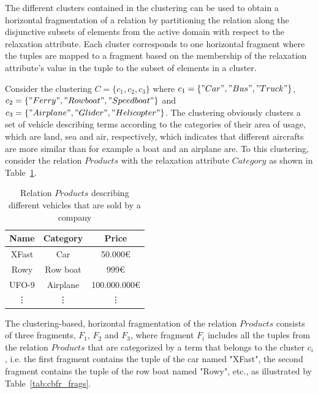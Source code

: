 The different clusters contained in the clustering can be used to obtain a horizontal fragmentation of a relation by partitioning the relation along the 
disjunctive subsets of elements from the active domain with respect to the relaxation attribute. Each cluster corresponds to one horizontal fragment where
the tuples are mapped to a fragment based on the membership of the relaxation attribute's value in the tuple to the subset of elements in a cluster. 

\begin{exmp}
\label{sec:meth_cbfr_exmp}
Consider the clustering $C=\{c_1, c_2, c_3\}$ where $c_1=\{"Car","Bus","Truck"\}$, $c_2=\{"Ferry","Row boat","Speedboat"\}$ and $c_3=\{"Airplane", 
"Glider","Helicopter"\}$. The clustering obviously clusters a set of vehicle describing terms according to the categories of their area of usage, which 
are land, sea and air, respectively, which indicates that different aircrafts are more similar than for example a boat and an airplane are. To this
clustering, consider the relation $Products$ with the relaxation attribute $Category$ as shown in Table~\ref{tab:cbfr_products}.

\begin{table}[h]
    \centering
    \begin{tabular}{|c|c|c|}
        \hline
        Name & Category & Price \\
        \hline
        XFast & Car & 50.000€ \\
        Rowy & Row boat & 999€ \\
        UFO-9 & Airplane & 100.000.000€ \\
        \vdots & \vdots & \vdots \\
        \hline
    \end{tabular}
    \caption{Relation $Products$ describing different vehicles that are sold by a company}
    \label{tab:cbfr_products}
\end{table}

The clustering-based, horizontal fragmentation of the relation $Products$ consists of three fragments, $F_1$, $F_2$ and $F_3$, where fragment $F_i$
includes all the tuples from the relation $Products$ that are categorized by a term that belongs to the cluster $c_i$, i.e. the first fragment contains
the tuple of the car named "XFast", the second fragment contains the tuple of the row boat named "Rowy", etc., as illustrated by
Table~\ref{tab:cbfr_frags}.


\end{exmp}

